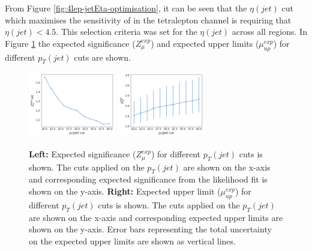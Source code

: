 From Figure \ref{fig:4lep-jetEta-optimisation}, it can be seen that the $\eta(jet)$ cut which maximises the sensitivity of \tWZ in the tetralepton channel is requiring that $\eta(jet) < 4.5$. This selection criteria was set for the $\eta(jet)$ across all regions. In Figure \ref{fig:4lep-jetpt-optimisation} the expected significance ($Z_{\mu}^{exp}$) and expected upper limits ($\mu_{up}^{exp}$) for different $p_{T}(jet)$ cuts are shown.
\begin{figure}[h!]
	\includegraphics[width = 0.34\textwidth]{figures/signif_jetPt.png}
  	\includegraphics[width = 0.34\textwidth]{figures/exp_upper_jetPt.png}
  \centering
	\caption{\textbf{Left:} Expected significance ($Z_{\mu}^{exp}$) for different $p_{T}(jet)$ cuts is shown. The cuts applied on the $p_{T}(jet)$ are shown on the x-axis and corresponding expected significance from the likelihood fit is shown on the y-axis. \textbf{Right:} Expected upper limit ($\mu_{up}^{exp}$) for different $p_{T}(jet)$ cuts is shown. The cuts applied on the $p_{T}(jet)$ are shown on the x-axis and corresponding expected upper limits are shown on the y-axis. Error bars representing the total uncertainty on the expected upper limits are shown as vertical lines.}
		\label{fig:4lep-jetpt-optimisation}
\end{figure}

